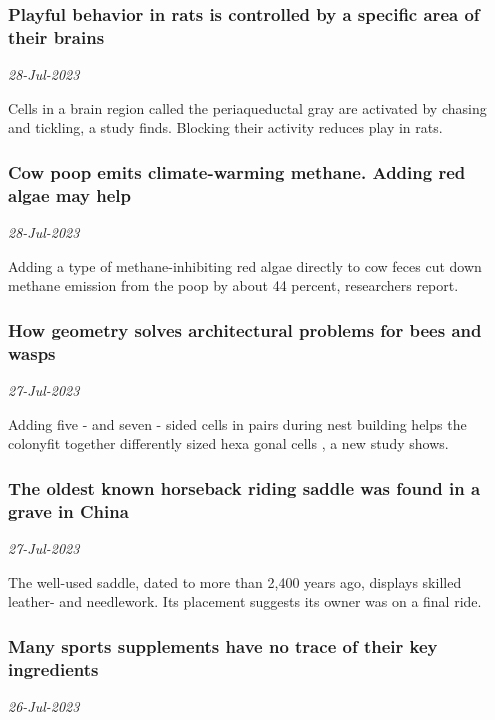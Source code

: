 \subsubsection{Playful behavior in rats is controlled by a specific area of their brains \href{https://www.sciencenews.org/article/playful-behavior-rats-area-brain}{}}
\textit{28-Jul-2023}

Cells in a brain region called the periaqueductal gray are activated by chasing and tickling, a study finds. Blocking their activity reduces play in rats.
\subsubsection{Cow poop emits climate-warming methane. Adding red algae may help \href{https://www.sciencenews.org/article/cow-poop-climate-warming-methane-red-algae}{}}
\textit{28-Jul-2023}

Adding a type of methane-inhibiting red algae directly to cow feces cut down methane emission from the poop by about 44 percent, researchers report.
\subsubsection{How geometry solves architectural problems for bees and wasps \href{https://www.sciencenews.org/article/geometry-architectural-problem-bee-wasp}{}}
\textit{27-Jul-2023}

Adding five - and seven - sided cells in pairs during nest building helps the colonyfit together differently sized hexa
gonal cells
, a new study shows.
\subsubsection{The oldest known horseback riding saddle was found in a grave in China \href{https://www.sciencenews.org/article/oldest-saddle-horseback-riding-china-grave}{}}
\textit{27-Jul-2023}

The well-used saddle, dated to more than 2,400 years ago, displays skilled leather- and needlework. Its placement suggests its owner was on a final ride.
\subsubsection{Many sports supplements have no trace of their key ingredients \href{https://www.sciencenews.org/article/sport-supplements-ingredients-dietary}{}}
\textit{26-Jul-2023}

